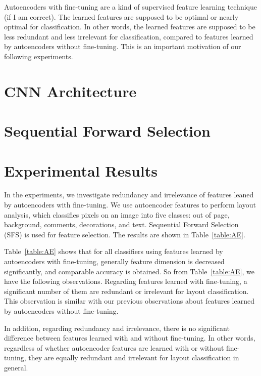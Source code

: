 \documentclass[conference]{IEEEtran}
\begin{document}
Autoencoders with fine-tuning are a kind of supervised feature learning technique (if I am correct).
The learned features are supposed to be optimal or nearly optimal for classification.
In other words, the learned features are supposed to be less redundant and less irrelevant for classification, compared to features learned by autoencoders without fine-tuning.
This is an important motivation of our following experiments.










\section{CNN Architecture}

\section{Sequential Forward Selection}


\section{Experimental Results}


In the experiments, we investigate redundancy and irrelevance of features leaned by autoencoders with fine-tuning.
We use autoencoder features to perform layout analysis, which classifies pixels on an image into five classes: out of page, background, comments, decorations, and text.
Sequential Forward Selection (SFS) is used for feature selection.
The results are shown in Table~\ref{table:AE}.

Table~\ref{table:AE} shows that for all classifiers using features learned by autoencoders with fine-tuning, generally feature dimension is decreased significantly, and comparable accuracy is obtained.
So from Table~\ref{table:AE}, we have the following observations.
Regarding features learned with fine-tuning, a significant number of them are redundant or irrelevant for layout classification.
This observation is similar with our previous observations about features learned by autoencoders without fine-tuning.

In addition, regarding redundancy and irrelevance, there is no significant difference between features learned with and without fine-tuning.
In other words, regardless of whether autoencoder features are learned with or without fine-tuning, they are equally redundant and irrelevant for layout classification in general.
\end{document}
